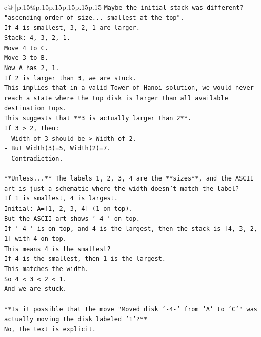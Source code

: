 \documentclass{article}
\begin{document}
{\begin{supertabular}{c@{$\;$}|p{.15\linewidth}@{}p{.15\linewidth}p{.15\linewidth}p{.15\linewidth}p{.15\linewidth}p{.15\linewidth}}
{{{\texttt{Maybe the initial stack was different?} \\
\texttt{"ascending order of size... smallest at the top".} \\
\texttt{If 4 is smallest, 3, 2, 1 are larger.} \\
\texttt{Stack: 4, 3, 2, 1.} \\
\texttt{Move 4 to C.} \\
\texttt{Move 3 to B.} \\
\texttt{Now A has 2, 1.} \\
\texttt{If 2 is larger than 3, we are stuck.} \\
\texttt{This implies that in a valid Tower of Hanoi solution, we would never reach a state where the top disk is larger than all available destination tops.} \\
\texttt{This suggests that **3 is actually larger than 2**.} \\
\texttt{If 3 > 2, then:} \\
\texttt{{-} Width of 3 should be > Width of 2.} \\
\texttt{{-} But Width(3)=5, Width(2)=7.} \\
\texttt{{-} Contradiction.} \\
\\ 
\texttt{**Unless...** The labels 1, 2, 3, 4 are the **sizes**, and the ASCII art is just a schematic where the width doesn't match the label?} \\
\texttt{If 1 is smallest, 4 is largest.} \\
\texttt{Initial: A={[}1, 2, 3, 4{]} (1 on top).} \\
\texttt{But the ASCII art shows `{-}4{-}` on top.} \\
\texttt{If `{-}4{-}` is on top, and 4 is the largest, then the stack is {[}4, 3, 2, 1{]} with 4 on top.} \\
\texttt{This means 4 is the smallest?} \\
\texttt{If 4 is the smallest, then 1 is the largest.} \\
\texttt{This matches the width.} \\
\texttt{So 4 < 3 < 2 < 1.} \\
\texttt{And we are stuck.} \\
\\ 
\texttt{**Is it possible that the move "Moved disk '{-}4{-}' from 'A' to 'C'" was actually moving the disk labeled '1'?**} \\
\texttt{No, the text is explicit.} \\
\\ 
}}}
\end{supertabular}}
\end{document}
